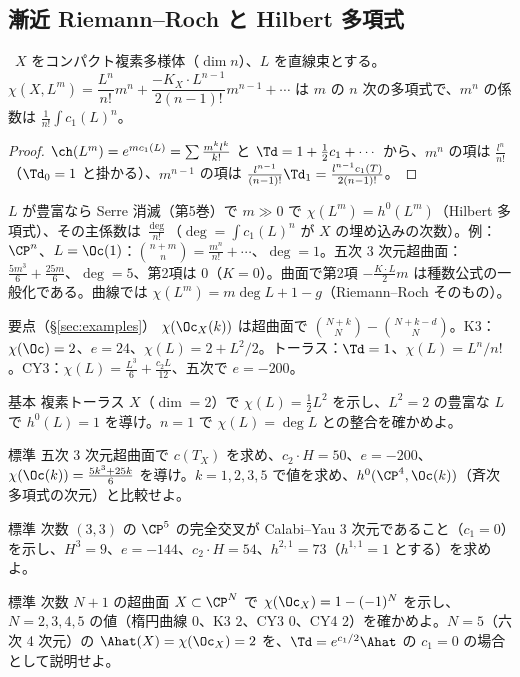 \subsection{漸近 Riemann--Roch と Hilbert 多項式}
\begin{prop}\label{prop:asympRR}\tP\
$X$ をコンパクト複素多様体（$\dim n$）、$L$ を直線束とする。$\chi(X,L^m)=\dfrac{L^n}{n!}m^n+\dfrac{-K_X\cdot L^{n-1}}{2(n-1)!}m^{n-1}+\cdots$ は $m$ の $n$ 次の多項式で、$m^n$ の係数は $\frac1{n!}\int c_1(L)^n$。
\end{prop}
\begin{proof}
$\ch(L^m)=e^{mc_1(L)}=\sum\frac{m^kl^k}{k!}$ と $\Td=1+\frac12c_1+\cdots$ から、$m^n$ の項は $\frac{l^n}{n!}$（$\Td_0=1$ と掛かる）、$m^{n-1}$ の項は $\frac{l^{n-1}}{(n-1)!}\Td_1=\frac{l^{n-1}c_1(T)}{2(n-1)!}$。
\end{proof}
\noindent $L$ が豊富なら Serre 消滅（第5巻）で $m\gg0$ で $\chi(L^m)=h^0(L^m)$（Hilbert 多項式）、その主係数は $\frac{\deg}{n!}$（$\deg=\int c_1(L)^n$ が $X$ の埋め込みの次数）。例：$\CP^n$、$L=\Oc(1)$：$\binom{n+m}n=\frac{m^n}{n!}+\cdots$、$\deg=1$。五次 3 次元超曲面：$\frac{5m^3}6+\frac{25m}6$、$\deg=5$、第2項は $0$（$K=0$）。曲面で第2項 $-\frac{K\cdot L}2m$ は種数公式の一般化である。曲線では $\chi(L^m)=m\deg L+1-g$（Riemann--Roch そのもの）。
\begin{keybox}{要点（\S\ref{sec:examples}）}
$\chi(\Oc_X(k))$ は超曲面で $\binom{N+k}N-\binom{N+k-d}N$。K3：$\chi(\Oc)=2$、$e=24$、$\chi(L)=2+L^2/2$。トーラス：$\Td=1$、$\chi(L)=L^n/n!$。CY3：$\chi(L)=\frac{L^3}6+\frac{c_2L}{12}$、五次で $e=-200$。
\end{keybox}
\begin{prob}{基本}\label{p:torus}
複素トーラス $X$（$\dim=2$）で $\chi(L)=\frac12L^2$ を示し、$L^2=2$ の豊富な $L$ で $h^0(L)=1$ を導け。$n=1$ で $\chi(L)=\deg L$ との整合を確かめよ。
\end{prob}
\begin{prob}{標準}\label{p:quintic}
五次 3 次元超曲面で $c(T_X)$ を求め、$c_2\cdot H=50$、$e=-200$、$\chi(\Oc(k))=\frac{5k^3+25k}6$ を導け。$k=1,2,3,5$ で値を求め、$h^0(\CP^4,\Oc(k))$（斉次多項式の次元）と比較せよ。
\end{prob}
\begin{prob}{標準}\label{p:CICY}
次数 $(3,3)$ の $\CP^5$ の完全交叉が Calabi--Yau 3 次元であること（$c_1=0$）を示し、$H^3=9$、$e=-144$、$c_2\cdot H=54$、$h^{2,1}=73$（$h^{1,1}=1$ とする）を求めよ。
\end{prob}
\begin{prob}{標準}\label{p:hypCY}
次数 $N+1$ の超曲面 $X\subset\CP^N$ で $\chi(\Oc_X)=1-(-1)^N$ を示し、$N=2,3,4,5$ の値（楕円曲線 $0$、K3 $2$、CY3 $0$、CY4 $2$）を確かめよ。$N=5$（六次 4 次元）の $\Ahat(X)=\chi(\Oc_X)=2$ を、$\Td=e^{c_1/2}\Ahat$ の $c_1=0$ の場合として説明せよ。
\end{prob}
